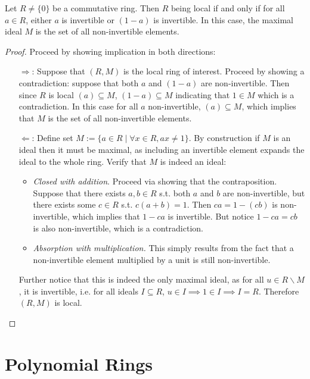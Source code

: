 \documentclass{article}
\begin{document}
\begin{proposition}
    Let $R\neq \{0\}$ be a commutative ring. Then $R$ being local if and only if for all $a\in R$, either $a$ is invertible or $(1-a)$ is invertible. In this case, the maximal ideal $M$ is the set of all non-invertible elements. 
\end{proposition}

\begin{proof}
    Proceed by showing implication in both directions:
    \begin{itemize}
        \item[$\Rightarrow$:] Suppose that $(R, M)$ is the local ring of interest. Proceed by showing a contradiction: suppose that both $a$ and $(1-a)$ are non-invertible. Then since $R$ is local $(a) \subseteq M$, $(1-a) \subseteq M$ indicating that $1\in M$ which is a contradiction. In this case for all $a$ non-invertible, $(a) \subseteq M$, which implies that $M$ is the set of all non-invertible elements. 
        \item[$\Leftarrow$:] Define set $M := \{ a\in R \mid \forall x\in R, ax \neq 1 \}$. By construction if $M$ is an ideal then it must be maximal, as including an invertible element expands the ideal to the whole ring. Verify that $M$ is indeed an ideal:
            \begin{itemize}
                \item \emph{Closed with addition}. Proceed via showing that the contraposition. Suppose that there exists $a, b\in R$ s.t. both $a$ and $b$ are non-invertible, but there exists some $c\in R$ s.t. $c(a + b) = 1$. Then $ca = 1 - (cb)$ is non-invertible, which implies that $1 - ca$ is invertible. But notice $1 - ca = cb$ is also non-invertible, which is a contradiction.
                \item \emph{Absorption with multiplication.} This simply results from the fact that a non-invertible element multiplied by a unit is still non-invertible. 
            \end{itemize}

        Further notice that this is indeed the only maximal ideal, as for all $u\in R\smallsetminus M$, it is invertible, i.e. for all ideals $I\subseteq R$, $u\in I\implies 1\in I \implies I = R$. Therefore $(R, M)$ is local. 
    \end{itemize}
\end{proof}

\newpage
\section{Polynomial Rings}
\end{document}
